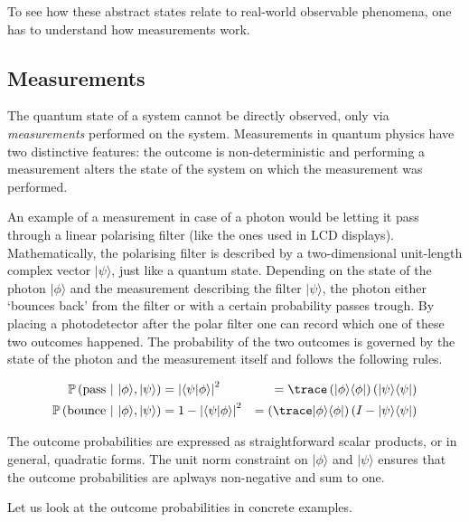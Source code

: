 To see how these abstract states relate to real-world observable phenomena, one has to understand how measurements work.

\subsection{Measurements}

The quantum state of a system cannot be directly observed, only via \emph{measurements} performed on the system. Measurements in quantum physics have two distinctive features: the outcome is non-deterministic and performing a measurement alters the state of the system on which the measurement was performed.

An example of a measurement in case of a photon would be letting it pass through a linear polarising filter (like the ones used in LCD displays). Mathematically, the polarising filter is described by a two-dimensional unit-length complex vector $\vert\psi\rangle$, just like a quantum state. Depending on the state of the photon $\vert\phi\rangle$ and the measurement describing the filter $\vert\psi\rangle$, the photon either `bounces back' from the filter or with a certain probability passes trough. By placing a photodetector after the polar filter one can record which one of these two outcomes happened. The probability of the two outcomes is governed by the state of the photon and the measurement itself and follows the following rules.

\begin{align}
	\mathbb{P}\left( \mbox{pass}\ \vert\ \vert\phi\rangle , \vert\psi\rangle \right) &= \left\vert\langle\psi\vert\phi\rangle\right\vert^2 &= \trace\left(\vert\phi\rangle\langle\phi\vert\right)\left(\vert\psi\rangle\langle\psi\vert\right) \\
	\mathbb{P}\left( \mbox{bounce}\ \vert\ \vert\phi\rangle , \vert\psi\rangle \right) &= 1 - \left\vert\langle\psi\vert\phi\rangle\right\vert^2 &= \left(\trace\vert\phi\rangle\langle\phi\vert\right)\left(I - \vert\psi\rangle\langle\psi\vert\right)
\end{align}

The outcome probabilities are expressed as straightforward scalar products, or in general, quadratic forms. The unit norm constraint on $\vert\phi\rangle$ and $\vert\psi\rangle$ ensures that the outcome probabilities are aplways non-negative and sum to one.

Let us look at the outcome probabilities in concrete examples.

